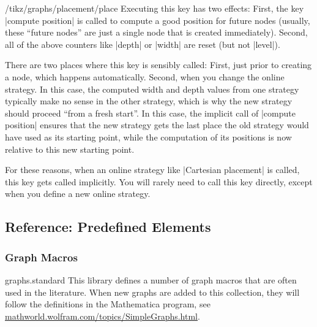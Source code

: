 \begin{key}{/tikz/graphs/placement/place}
    Executing this key has two effects: First, the key |compute position| is
    called to compute a good position for future nodes (usually, these ``future
    nodes'' are just a single node that is created immediately). Second, all of
    the above counters like |depth| or |width| are reset (but not |level|).

    There are two places where this key is sensibly called: First, just prior
    to creating a node, which happens automatically. Second, when you change
    the online strategy. In this case, the computed width and depth values from
    one strategy typically make no sense in the other strategy, which is why
    the new strategy should proceed ``from a fresh start''. In this case, the
    implicit call of |compute position| ensures that the new strategy gets the
    last place the old strategy would have used as its starting point, while
    the computation of its positions is now relative to this new starting
    point.

    For these reasons, when an online strategy like |Cartesian placement| is
    called, this key gets called implicitly. You will rarely need to call this
    key directly, except when you define a new online strategy.
\end{key}


\subsection{Reference: Predefined Elements}
\label{section-library-graphs-reference}

\subsubsection{Graph Macros}
\label{section-library-graphs-reference-macros}

\begin{tikzlibrary}{graphs.standard}
    This library defines a number of graph macros that are often used in the
    literature. When new graphs are added to this collection, they will follow
    the definitions in the Mathematica program, see
    \url{mathworld.wolfram.com/topics/SimpleGraphs.html}.
\end{tikzlibrary}


